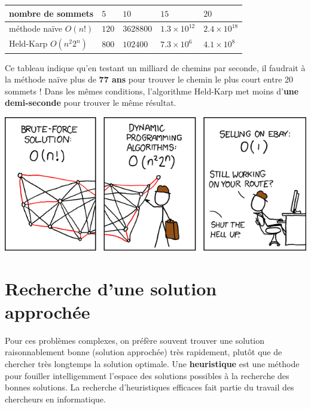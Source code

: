 \documentclass[a5paper,pagesize,DIV=14]{scrbook}
\begin{document}
\begin{center}
  \begin{tabular}{|l|llll|}
    \hline
    nombre de sommets       & $5$   & $10$      & $15$            & $20$ \\
    \hline
    méthode naïve $O(n!)$   & $120$ & $3628800$ & $1.3 \times 10^{12}$ & $2.4 \times 10^{18}$ \\
    Held-Karp $O(n^{2}2^n)$ & $800$ & $102400$  & $7.3 \times 10^6$       & $4.1 \times 10^8$ \\
    \hline
  \end{tabular} 
\end{center}

Ce tableau indique qu'en testant un milliard de chemins par seconde, il faudrait à la méthode naïve plus de \textbf{77 ans} pour trouver le chemin le plus court entre 20 sommets ! Dans les mêmes conditions, l'algorithme Held-Karp met moins d'\textbf{une demi-seconde} pour trouver le même résultat.

  \begin{center}
    \includegraphics[width=\linewidth]{img/tsp_xkcd.png}
    \label{img:tsp_xkcd}
  \end{center}

\section*{Recherche d'une solution approchée}

Pour ces problèmes complexes, on préfère souvent trouver une solution
raisonnablement bonne (solution approchée) très rapidement, plutôt que de
chercher très longtemps la solution optimale. Une \textbf{heuristique} est une
méthode pour fouiller intelligemment l'espace des solutions possibles à la
recherche des bonnes solutions. La recherche d'heuristiques efficaces fait
partie du travail des chercheurs en informatique.
\end{document}
